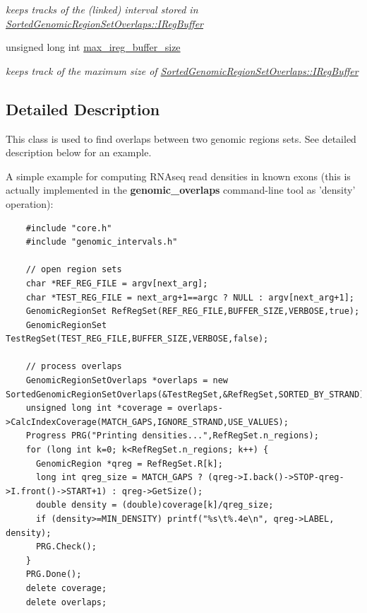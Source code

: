 \begin{CompactItemize}
\begin{CompactList}\small\item\em keeps tracks of the (linked) interval stored in \hyperlink{classSortedGenomicRegionSetOverlaps_19fa18e6abd9f045786698fff48a445f}{SortedGenomicRegionSetOverlaps::IRegBuffer} \item\end{CompactList}\item 
\hypertarget{classSortedGenomicRegionSetOverlaps_349d589ff006f742d635b16987fe7b6b}{
unsigned long int \hyperlink{classSortedGenomicRegionSetOverlaps_349d589ff006f742d635b16987fe7b6b}{max\_\-ireg\_\-buffer\_\-size}}
\label{classSortedGenomicRegionSetOverlaps_349d589ff006f742d635b16987fe7b6b}

\begin{CompactList}\small\item\em keeps track of the maximum size of \hyperlink{classSortedGenomicRegionSetOverlaps_19fa18e6abd9f045786698fff48a445f}{SortedGenomicRegionSetOverlaps::IRegBuffer} \item\end{CompactList}\end{CompactItemize}


\subsection{Detailed Description}
This class is used to find overlaps between two genomic regions sets. See detailed description below for an example. 

A simple example for computing RNAseq read densities in known exons (this is actually implemented in the {\bf genomic\_\-overlaps} command-line tool as 'density' operation): 

\begin{Code}\begin{verbatim}    #include "core.h"
    #include "genomic_intervals.h"
 
    // open region sets
    char *REF_REG_FILE = argv[next_arg];
    char *TEST_REG_FILE = next_arg+1==argc ? NULL : argv[next_arg+1];
    GenomicRegionSet RefRegSet(REF_REG_FILE,BUFFER_SIZE,VERBOSE,true);
    GenomicRegionSet TestRegSet(TEST_REG_FILE,BUFFER_SIZE,VERBOSE,false);

    // process overlaps
    GenomicRegionSetOverlaps *overlaps = new SortedGenomicRegionSetOverlaps(&TestRegSet,&RefRegSet,SORTED_BY_STRAND);
    unsigned long int *coverage = overlaps->CalcIndexCoverage(MATCH_GAPS,IGNORE_STRAND,USE_VALUES); 
    Progress PRG("Printing densities...",RefRegSet.n_regions);
    for (long int k=0; k<RefRegSet.n_regions; k++) {
      GenomicRegion *qreg = RefRegSet.R[k];
      long int qreg_size = MATCH_GAPS ? (qreg->I.back()->STOP-qreg->I.front()->START+1) : qreg->GetSize();
      double density = (double)coverage[k]/qreg_size;
      if (density>=MIN_DENSITY) printf("%s\t%.4e\n", qreg->LABEL, density);
      PRG.Check();
    }
    PRG.Done();
    delete coverage;
    delete overlaps;
\end{verbatim}
\end{Code}

